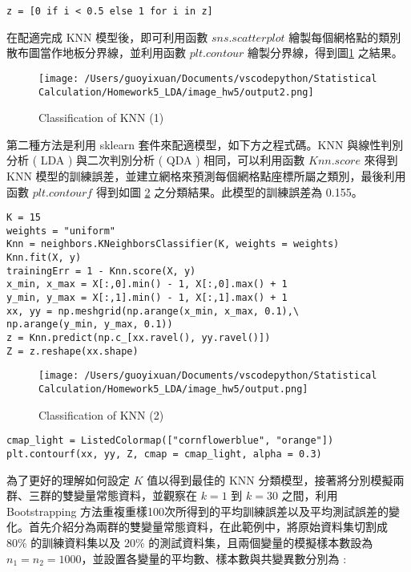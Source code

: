 \begin{itemize}
\begin{lstlisting}
z = [0 if i < 0.5 else 1 for i in z]
\end{lstlisting}

在配適完成 KNN 模型後，即可利用函數 $sns.scatterplot$ 繪製每個網格點的類別散布圖當作地板分界線，並利用函數 $plt.contour$ 繪製分界線，得到圖\ref{fig:knn1} 之結果。

\begin{figure}[H]
    \centering
        \texttt{[image: /Users/guoyixuan/Documents/vscodepython/Statistical Calculation/Homework5\_LDA/image\_hw5/output2.png]}
    \caption{Classification of KNN (1)}
    \label{fig:knn1}
\end{figure}

第二種方法是利用 sklearn 套件來配適模型，如下方之程式碼。KNN 與線性判別分析 ( LDA ) 與二次判別分析 ( QDA ) 相同，可以利用函數 $Knn.score$ 來得到 KNN 模型的訓練誤差，並建立網格來預測每個網格點座標所屬之類別，最後利用函數 $plt.contourf$ 得到如圖 \ref{fig:knn2} 之分類結果。此模型的訓練誤差為 0.155。

\bigskip
\begin{lstlisting}
K = 15
weights = "uniform"
Knn = neighbors.KNeighborsClassifier(K, weights = weights)
Knn.fit(X, y)
trainingErr = 1 - Knn.score(X, y)
x_min, x_max = X[:,0].min() - 1, X[:,0].max() + 1
y_min, y_max = X[:,1].min() - 1, X[:,1].max() + 1
xx, yy = np.meshgrid(np.arange(x_min, x_max, 0.1),\
np.arange(y_min, y_max, 0.1))
z = Knn.predict(np.c_[xx.ravel(), yy.ravel()])
Z = z.reshape(xx.shape)
\end{lstlisting}

\begin{figure}[H]
    \centering
        \texttt{[image: /Users/guoyixuan/Documents/vscodepython/Statistical Calculation/Homework5\_LDA/image\_hw5/output.png]}
    \caption{Classification of KNN (2)}
    \label{fig:knn2}
\end{figure}

\bigskip

\begin{lstlisting}
cmap_light = ListedColormap(["cornflowerblue", "orange"])
plt.contourf(xx, yy, Z, cmap = cmap_light, alpha = 0.3)
\end{lstlisting}

\end{itemize}

為了更好的理解如何設定 $K$ 值以得到最佳的 KNN 分類模型，接著將分別模擬兩群、三群的雙變量常態資料，並觀察在 $k=1$ 到 $k=30$ 之間，利用 Bootstrapping 方法重複重樣100次所得到的平均訓練誤差以及平均測試誤差的變化。首先介紹分為兩群的雙變量常態資料，在此範例中，將原始資料集切割成 $80\%$ 的訓練資料集以及 $20\%$ 的測試資料集，且兩個變量的模擬樣本數設為 $n_1=n_2=1000$，並設置各變量的平均數、樣本數與共變異數分別為 :


